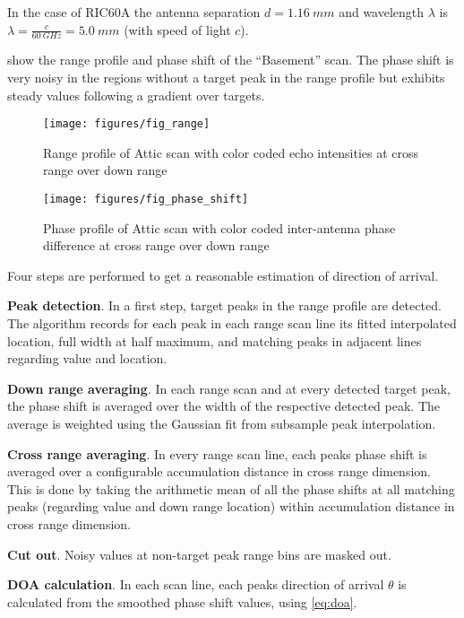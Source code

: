 In the case of RIC60A the antenna separation \(d=\SI{1.16}{mm}\) and
wavelength \(\lambda\) is \(\lambda=\frac{c}{\SI{60}{GHz}}=\SI{5.0}{mm}\) (with speed
of light \(c\)).

 show the range profile and phase shift of the
``Basement'' scan. The phase shift is very noisy in the regions without
a target peak in the range profile but exhibits steady values following
a gradient over targets.

\begin{figure}[htbp]
    \centering
    \texttt{[image: figures/fig\_range]}
    \caption{Range profile of Attic scan with color coded echo intensities at cross range over down range}
    \label{fig:fig_range}
\end{figure}

\begin{figure}[htbp]
    \centering
    \texttt{[image: figures/fig\_phase\_shift]}
    \caption{Phase profile of Attic scan with color coded inter-antenna phase difference at cross range over down range}
    \label{fig:fig_phase_shift}
\end{figure}

Four steps are performed to get a reasonable estimation of direction of
arrival.

\textbf{Peak detection}. In a first step, target peaks in the
range profile are detected. The algorithm records for each peak in each
range scan line its fitted interpolated location, full width at half
maximum, and matching peaks in adjacent lines regarding value and
location.

\textbf{Down range averaging}. In each range scan and at every
detected target peak, the phase shift is averaged over the width of the
respective detected peak. The average is weighted using the Gaussian fit
from subsample peak interpolation.

\textbf{Cross range averaging}. In
every range scan line, each peaks phase shift is averaged over a
configurable accumulation distance in cross range dimension. This is
done by taking the arithmetic mean of all the phase shifts at all
matching peaks (regarding value and down range location) within
accumulation distance in cross range dimension.

\textbf{Cut out}. Noisy
values at non-target peak range bins are masked out.

\textbf{DOA calculation}. In each scan line, each peaks direction of arrival
\(\theta\) is calculated from the smoothed phase shift values, using \cref{eq:doa}.

